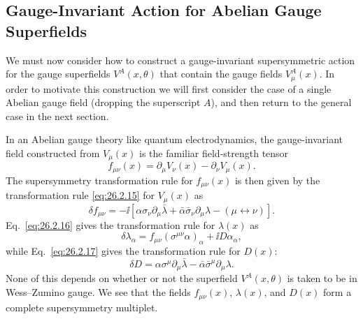 
\providecommand{\SuperD}{\mathcal{D}}

\subsection{Gauge-Invariant Action for Abelian Gauge Superfields}

We must now consider how to construct a gauge-invariant supersymmetric
action for the gauge superfields \(V^A(x,\theta)\) that contain the gauge
fields \(V_\mu^A(x)\). In order to motivate this construction we will first
consider the case of a single Abelian gauge field (dropping the superscript
\(A\)), and then return to the general case in the next section.

In an Abelian gauge theory like quantum electrodynamics, the gauge-invariant
field constructed from \(V_\mu(x)\) is the familiar field-strength tensor
\begin{equation}
  f_{\mu\nu}(x)
  =\partial_\mu V_\nu(x)-\partial_\nu V_\mu(x).
  \tag{27.2.1}\label{eq:27.2.1}
\end{equation}
The supersymmetry transformation rule for \(f_{\mu\nu}(x)\) is then given
by the transformation rule \eqref{eq:26.2.15} for \(V_\mu(x)\) as
\begin{equation}
  \delta f_{\mu\nu}
  =-\ii\left[
    \alpha\sigma_\nu\partial_\mu\bar\lambda
    +
    \bar\alpha\bar\sigma_\nu\partial_\mu\lambda
    -(\mu\leftrightarrow\nu)
  \right].
  \tag{27.2.2}\label{eq:27.2.2}
\end{equation}
Eq.~\eqref{eq:26.2.16} gives the transformation rule for \(\lambda(x)\) as
\begin{equation}
  \delta\lambda_\alpha
  =f_{\mu\nu}(\sigma^{\mu\nu}\alpha)_\alpha
    +\ii D\alpha_\alpha,
  \tag{27.2.3}\label{eq:27.2.3}
\end{equation}
while Eq.~\eqref{eq:26.2.17} gives the transformation rule for \(D(x)\):
\begin{equation}
  \delta D
  =\alpha\sigma^\mu\partial_\mu\bar\lambda
   -\bar\alpha\bar\sigma^\mu\partial_\mu\lambda.
  \tag{27.2.4}\label{eq:27.2.4}
\end{equation}
None of this depends on whether or not the superfield \(V^A(x,\theta)\) is
taken to be in Wess--Zumino gauge. We see that the fields
\(f_{\mu\nu}(x)\), \(\lambda(x)\), and \(D(x)\) form a complete
supersymmetry multiplet.

